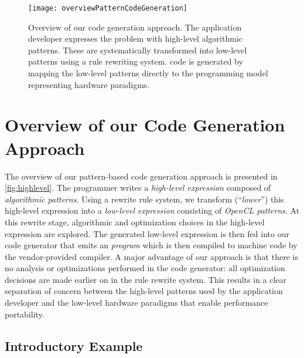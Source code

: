 \begin{figure}[tb]
\centering
\texttt{[image: overviewPatternCodeGeneration]}
\caption[Overview of our code generation approach.]{
Overview of our code generation approach.
The application developer expresses the problem with high-level algorithmic patterns.
These are systematically transformed into low-level \OpenCL patterns using a rule rewriting system.
\OpenCL code is generated by mapping the low-level patterns directly to the \OpenCL programming model representing hardware paradigms.
}
\label{fig:highlevel}
\end{figure}

\newpage
\section{Overview of our Code Generation Approach}
\label{section:code-generation:overview}

The overview of our pattern-based code generation approach is presented in \autoref{fig:highlevel}.
The programmer writes a \emph{high-level expression} composed of \emph{algorithmic patterns}.
Using a rewrite rule system, we transform (``\emph{lower}'') this high-level expression into a \emph{low-level expression} consisting of \emph{OpenCL patterns}.
At this rewrite stage, algorithmic and optimization choices in the high-level expression are explored.
The generated low-level expression is then fed into our code generator that emits an \emph{\OpenCL program} which is then compiled to machine code by the vendor-provided \OpenCL compiler.
A major advantage of our approach is that there is no analysis or optimizations performed in the code generator:
all optimization decisions are made earlier on in the rule rewrite system.
This results in a clear separation of concern between the high-level patterns used by the application developer and the low-level hardware paradigms that enable performance portability.


\newpage
\subsection{Introductory Example}

